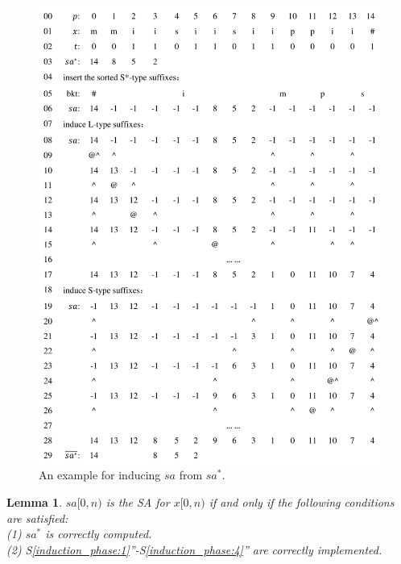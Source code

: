 \documentclass[10pt,journal,compsoc]{IEEEtran}
\newtheorem{lemma}[theorem]{Lemma}
\begin{document}
\begin{figure}[t]
	\centering
	
	\includegraphics[width = 1\columnwidth]{example.pdf}
	
	\caption{An example for inducing $sa$ from $sa^*$.}
	
	\label{fig:example1}
	
\end{figure}


\begin{lemma} \label{lemma:2}
    $sa[0, n)$ is the SA for $x[0, n)$ if and only if the following conditions are satisfied: \\
    (1) $sa^*$ is correctly computed. \\
    (2) S\ref{induction_phase:1}''-S\ref{induction_phase:4}'' are correctly implemented. \\
\end{lemma}
\end{document}
